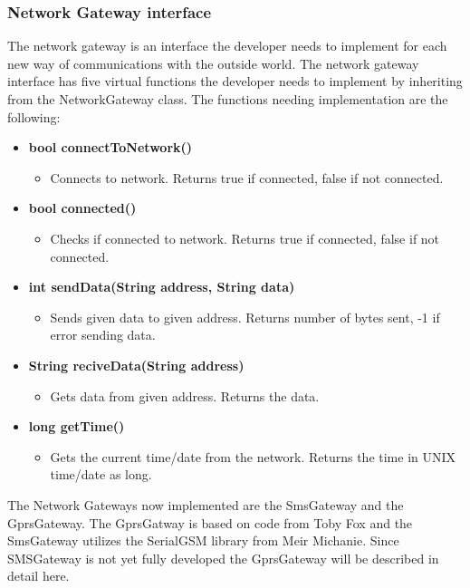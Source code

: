 \subsubsection{Network Gateway interface}
The network gateway is an interface the developer needs to implement for each new way 
of communications with the outside world. The network gateway interface has five virtual 
functions the developer needs to implement by inheriting from the NetworkGateway class.
The functions needing implementation are the following:
\begin{itemize}
    \item \textbf{bool connectToNetwork()}
        \begin{itemize}
            \item Connects to network. Returns true if connected, false if not
                  connected.
        \end{itemize}
    \item \textbf{bool connected()}
        \begin{itemize}
            \item Checks if connected to network. Returns true if connected, false
                  if not connected.
        \end{itemize}
    \item \textbf{int sendData(String address, String data)}
        \begin{itemize}
            \item Sends given data to given address. Returns number of bytes sent, -1 if 
                  error sending data.
        \end{itemize}
    \item \textbf{String reciveData(String address)}
        \begin{itemize}
            \item Gets data from given address. Returns the data.
        \end{itemize}
     \item \textbf{long getTime()}
        \begin{itemize}
            \item Gets the current time/date from the network. Returns the time in UNIX time/date as long.
        \end{itemize}
\end{itemize}
The Network Gateways now implemented are the SmsGateway and the GprsGateway. The 
GprsGatway is based on code from Toby Fox\cite{tobek} and the SmsGateway utilizes the
SerialGSM library from Meir Michanie\cite{meirm}. Since SMSGateway is not yet fully
developed the GprsGateway will be described in detail here.

